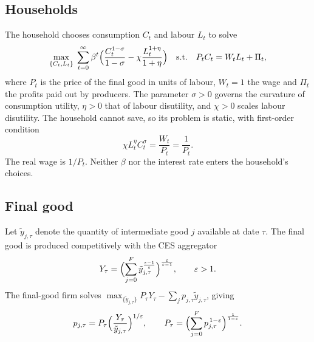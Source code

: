 \documentclass[11pt]{article}
\theoremstyle{definition}
\begin{document}
\subsection{Households}\label{sec:hh}

The household chooses consumption $C_t$ and labour $L_t$ to solve
\begin{equation}\label{eq:hh}
  \max_{\{C_t,L_t\}}\;\sum_{t=0}^{\infty}\beta^t
     \Bigl(\frac{C_t^{1-\sigma}}{1-\sigma}-\chi\frac{L_t^{1+\eta}}{1+\eta}\Bigr)
  \quad\text{s.t.}\quad P_tC_t=W_tL_t+\Pi_t ,
\end{equation}
where $P_t$ is the price of the final good in units of labour, $W_t=1$ the wage and $\Pi_t$ the profits
paid out by producers. The parameter $\sigma>0$ governs the curvature of consumption utility,
$\eta>0$ that of labour disutility, and $\chi>0$ scales labour disutility. The household cannot save,
so its problem is static, with first-order condition
\begin{equation}\label{eq:foc}
  \chi L_t^{\eta}C_t^{\sigma}=\frac{W_t}{P_t}=\frac{1}{P_t} .
\end{equation}
The real wage is $1/P_t$. Neither $\beta$ nor the interest rate enters the household's choices.

\subsection{Final good}\label{sec:final}

Let $\tilde y_{j,\tau}$ denote the quantity of intermediate good $j$ available at date $\tau$. The
final good is produced competitively with the CES aggregator
\begin{equation}\label{eq:ces}
  Y_\tau=\Bigl(\sum_{j=0}^{F}\tilde y_{j,\tau}^{\frac{\varepsilon-1}{\varepsilon}}\Bigr)^{\frac{\varepsilon}{\varepsilon-1}},
  \qquad\varepsilon>1 .
\end{equation}
The final-good firm solves $\max_{\{\tilde y_{j,\tau}\}}P_\tau Y_\tau-\sum_j p_{j,\tau}\tilde y_{j,\tau}$, giving
\begin{equation}\label{eq:demand}
  p_{j,\tau}=P_\tau\Bigl(\frac{Y_\tau}{\tilde y_{j,\tau}}\Bigr)^{1/\varepsilon},\qquad
  P_\tau=\Bigl(\sum_{j=0}^{F}p_{j,\tau}^{\,1-\varepsilon}\Bigr)^{\frac{1}{1-\varepsilon}} .
\end{equation}

\end{document}
